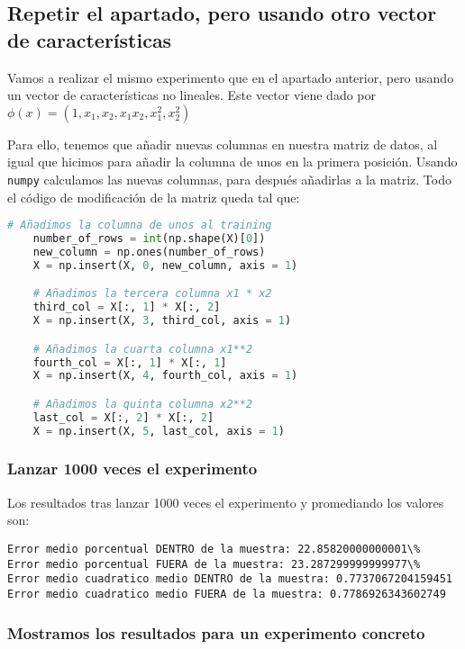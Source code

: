 \documentclass[11pt]{article}
\begin{document}
\subsection{Repetir el apartado, pero usando otro vector de características}

Vamos a realizar el mismo experimento que en el apartado anterior, pero usando un vector de características no lineales. Este vector viene dado por $\phi(x) = (1, x_1, x_2, x_1 x_2, x_1^2, x_2^2)$

Para ello, tenemos que añadir nuevas columnas en nuestra matriz de datos, al igual que hicimos para añadir la columna de unos en la primera posición. Usando \lstinline{numpy} calculamos las nuevas columnas, para después añadirlas a la matriz. Todo el código de modificación de la matriz queda tal que:

\begin{lstlisting}[language=Python]
    # Añadimos la columna de unos al training
    number_of_rows = int(np.shape(X)[0])
    new_column = np.ones(number_of_rows)
    X = np.insert(X, 0, new_column, axis = 1)

    # Añadimos la tercera columna x1 * x2
    third_col = X[:, 1] * X[:, 2]
    X = np.insert(X, 3, third_col, axis = 1)

    # Añadimos la cuarta columna x1**2
    fourth_col = X[:, 1] * X[:, 1]
    X = np.insert(X, 4, fourth_col, axis = 1)

    # Añadimos la quinta columna x2**2
    last_col = X[:, 2] * X[:, 2]
    X = np.insert(X, 5, last_col, axis = 1)
\end{lstlisting}

\subsubsection{Lanzar 1000 veces el experimento}

Los resultados tras lanzar 1000 veces el experimento y promediando los valores son:

\begin{lstlisting}
Error medio porcentual DENTRO de la muestra: 22.85820000000001\%
Error medio porcentual FUERA de la muestra: 23.287299999999977\%
Error medio cuadratico medio DENTRO de la muestra: 0.7737067204159451
Error medio cuadratico medio FUERA de la muestra: 0.7786926343602749
\end{lstlisting}

\subsubsection{Mostramos los resultados para un experimento concreto}
\end{document}
